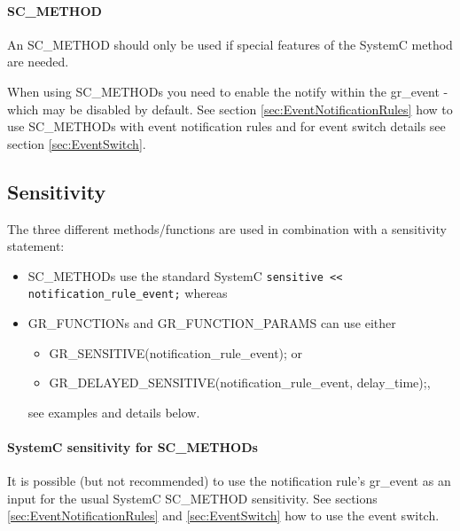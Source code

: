 \paragraph{SC\_METHOD}  
An {\sffamily SC\_METHOD} should only be used if special features of the SystemC method are needed.


When using {\sffamily SC\_METHOD}s you need to enable the notify within the {\sffamily gr\_event} - which may be disabled by default. See section \ref{sec:EventNotificationRules} how to use {\sffamily SC\_METHOD}s with event notification rules and for event switch details see section \ref{sec:EventSwitch}.


\subsection{Sensitivity}
\label{sec:sensitivity}

The three different methods/functions are used in combination with a sensitivity statement: \vspace{-1em}
\begin{itemize}
  \item {\sffamily SC\_METHOD}s use the standard SystemC \lstinline|sensitive << notification_rule_event;| \newline
  whereas
  \item {\sffamily GR\_FUNCTION}s and {\sffamily GR\_FUNCTION\_PARAMS} can use either 
    \begin{itemize}
      \item {\sffamily GR\_SENSITIVE(notification\_rule\_event);} or 
      \item {\sffamily GR\_DELAYED\_SENSITIVE(notification\_rule\_event, delay\_time);}, 
    \end{itemize}
   see examples and details below.
\end{itemize}

\paragraph{SystemC sensitivity for {\sffamily SC\_METHOD}s}
It is possible (but not recommended) to use the notification rule's {\sffamily gr\_event} as an input for the usual SystemC {\sffamily SC\_METHOD} sensitivity. See sections \ref{sec:EventNotificationRules} and \ref{sec:EventSwitch} how to use the event switch.

